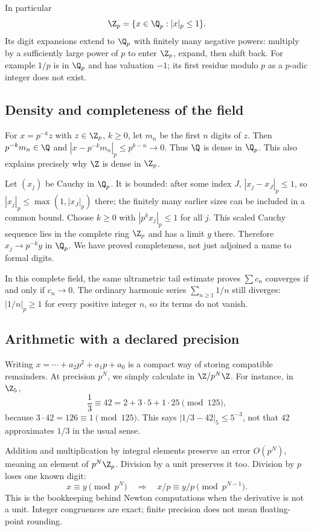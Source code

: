 In particular
\[
\Z_p=\{x\in\Q_p:|x|_p\le1\}.
\]
Its digit expansions extend to $\Q_p$ with finitely many negative powers:
multiply by a sufficiently large power of $p$ to enter $\Z_p$, expand,
then shift back. For example $1/p$ is in $\Q_p$ and has valuation $-1$;
its first residue modulo $p$ as a $p$-adic integer does not exist.

\subsection*{Density and completeness of the field}

For $x=p^{-k}z$ with $z\in\Z_p$, $k\ge0$, let $m_n$ be the first
$n$ digits of $z$. Then $p^{-k}m_n\in\Q$ and
$|x-p^{-k}m_n|_p\le p^{k-n}\to0$. Thus $\Q$ is dense in $\Q_p$.
This also explains precisely why $\Z$ is dense in $\Z_p$.

Let $(x_j)$ be Cauchy in $\Q_p$. It is bounded:
after some index $J$, $|x_j-x_J|_p\le1$, so
$|x_j|_p\le\max(1,|x_J|_p)$ there; the finitely many earlier sizes
can be included in a common bound. Choose $k\ge0$ with
$|p^kx_j|_p\le1$ for all $j$. This scaled Cauchy sequence lies in
the complete ring $\Z_p$ and has a limit $y$ there.
Therefore $x_j\to p^{-k}y$ in $\Q_p$.
We have proved completeness, not just adjoined a name to formal digits.

In this complete field, the same ultrametric tail estimate proves
$\sum c_n$ converges if and only if $c_n\to0$.
The ordinary harmonic series $\sum_{n\ge1}1/n$ still diverges:
$|1/n|_p\ge1$ for every positive integer $n$, so its terms do not vanish.

\subsection*{Arithmetic with a declared precision}
Writing $x=\cdots+a_2p^2+a_1p+a_0$ is a compact way of storing compatible
remainders. At precision $p^N$, we simply calculate in $\Z/p^N\Z$.
For instance, in $\Z_5$,
\[
\frac13\equiv42=2+3\cdot5+1\cdot25\pmod{125},
\]
because $3\cdot42=126\equiv1\pmod{125}$. This says
$|1/3-42|_5\le5^{-3}$, not that $42$ approximates $1/3$ in the usual sense.

Addition and multiplication by integral elements preserve an error
$O(p^N)$, meaning an element of $p^N\Z_p$. Division by a unit preserves it too.
Division by $p$ loses one known digit:
\[
x\equiv y\pmod{p^N}\quad\Longrightarrow\quad
x/p\equiv y/p\pmod{p^{N-1}}.
\]
This is the bookkeeping behind Newton computations when the derivative is
not a unit. Integer congruences are exact; finite precision does not mean
floating-point rounding.

